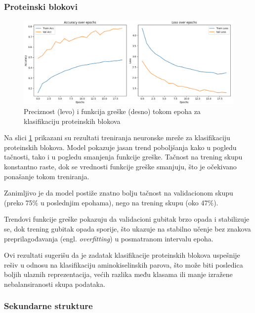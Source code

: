 \documentclass[a4paper,12pt]{article}
\begin{document}
\subsubsection*{Proteinski blokovi}

\begin{figure}[htbp]
    \centering
    \includegraphics[width=1\textwidth]{images/epochs_pb.png}
    \caption{Preciznost (levo) i funkcija greške (desno) tokom epoha za klasifikaciju proteinskih blokova}
    \label{fig:pb_accuracy_loss}
\end{figure}

Na slici \ref{fig:pb_accuracy_loss} prikazani su rezultati treniranja neuronske mreže za klasifikaciju proteinskih blokova. Model pokazuje jasan trend poboljšanja kako u pogledu tačnosti, tako i u pogledu smanjenja funkcije greške. Tačnost na trening skupu konstantno raste, dok se vrednosti funkcije greške smanjuju, što je očekivano ponašanje tokom treniranja.

Zanimljivo je da model postiže znatno bolju tačnost na validacionom skupu (preko 75\% u poslednjim epohama), nego na trening skupu (oko 47\%).

Trendovi funkcije greške pokazuju da validacioni gubitak brzo opada i stabilizuje se, dok trening gubitak opada sporije, što ukazuje na stabilno učenje bez znakova preprilagođavanja (engl. \textit{overfitting}) u posmatranom intervalu epoha.

Ovi rezultati sugerišu da je zadatak klasifikacije proteinskih blokova uspešnije rešiv u odnosu na klasifikaciju aminokiselinskih parova, što može biti posledica boljih ulaznih reprezentacija, većih razlika među klasama ili manje izražene nebalansiranosti skupa podataka.

\subsubsection*{Sekundarne strukture}
\end{document}
